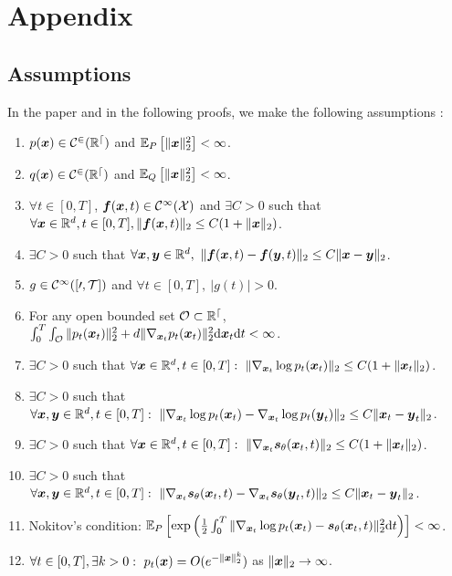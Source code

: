 %
\pagestyle{empty}
\hfill
\vfill
{}
\section*{Appendix}\label{sec:appendix}

\subsection{Assumptions}\label{sec:appendix:assumptionssong}
In the paper and in the following proofs, we make the following assumptions :
\begin{enumerate}
    \item $p(\boldsymbol{x}) \in \cal C^2(\mathbb{R}^d)$ and $\mathbb{E}_P\left[\Vert \boldsymbol{x} \Vert_2^2\right] < \infty$.
    \item $q(\boldsymbol{x}) \in \cal C^2(\mathbb{R}^d)$ and $\mathbb{E}_Q\left[\Vert \boldsymbol{x} \Vert_2^2\right] < \infty$.
    \item $\forall t \in [0, T]$, $\boldsymbol{f}(\boldsymbol{x}, t) \in \cal C^1(\mathcal{X})$ and $\exists C>0$ such that $\forall \boldsymbol{x} \in \mathbb{R}^d,t\in[0, T],\Vert \boldsymbol{f}(\boldsymbol{x}, t)\Vert_2 \leq C( 1+\Vert\boldsymbol{x}\Vert_2)$. 
    \item $\exists C >0 $ such that $\forall \vx, \vy \in \reals^d, \ \Vert \vf(\vx, t) - \vf(\vy, t)\Vert_2 \leq C\Vert \vx - \vy\Vert_2$.
    \item $g\in \cal C^1([0, T])$ and $\forall t \in [0, T],\ \vert g(t)\vert > 0$.
    \item For any open bounded set $\cal O \subset \mathbb{R}^d$, $\int_0^T \int_{\cal O} \Vert p_t(\boldsymbol{x}_t) \Vert_2^2 + d\Vert \nabla_{\boldsymbol{x}_t}p_t(\boldsymbol{x}_t) \Vert_2^2\mathrm{d} \boldsymbol{x}_t \mathrm{d} t < \infty$.
    \item $\exists C >0$ such that $\forall \boldsymbol{x}\in \mathbb{R}^d, t\in[0,T]:\ \Vert\nabla_{\boldsymbol{x}_t} \log p_t(\boldsymbol{x}_t)\Vert_2 \leq C(1+\Vert \boldsymbol{x}_t\Vert_2)$.
    \item $\exists C >0$ such that $\forall \boldsymbol{x},\boldsymbol{y}\in \mathbb{R}^d,t\in[0,T]:\ \Vert\nabla_{\boldsymbol{x}_t} \log p_t(\boldsymbol{x}_t) - \nabla_{\boldsymbol{x}_t} \log p_t(\boldsymbol{y}_t)\Vert_2 \leq C\Vert \boldsymbol{x}_t - \boldsymbol{y}_t\Vert_2$.
    \item $\exists C>0$ such that $\forall \boldsymbol{x}\in \mathbb{R}^d, t\in[0,T]:\ \Vert\nabla_{\boldsymbol{x}_t} \boldsymbol{s}_\theta(\boldsymbol{x}_t, t)\Vert_2 \leq C(1+\Vert \boldsymbol{x}_t\Vert_2)$.
    \item $\exists C>0$ such that $\forall \boldsymbol{x},\boldsymbol{y}\in \mathbb{R}^d,t\in[0,T]:\ \Vert\nabla_{\boldsymbol{x}_t} \boldsymbol{s}_\theta(\boldsymbol{x}_t, t) - \nabla_{\boldsymbol{x}_t} \boldsymbol{s}_\theta(\boldsymbol{y}_t, t)\Vert_2 \leq C\Vert \boldsymbol{x}_t - \boldsymbol{y}_t\Vert_2$.
    \item Nokitov's condition: $\mathbb{E}_P\left[\exp\left(\frac{1}{2}\int_0^T\Vert \nabla_{\boldsymbol{x}_t} \log p_t(\boldsymbol{x}_t)-\boldsymbol{s}_\theta(\boldsymbol{x}_t, t)\Vert_2^2\mathrm{d} t\right)\right] < \infty$.
    \item  $\forall t\in[0, T], \exists k>0: \ p_t(\vx)=O(e^{-\Vert \vx \Vert_2^k})$ as $\Vert \boldsymbol{x} \Vert_2 \to \infty$.
\end{enumerate}

